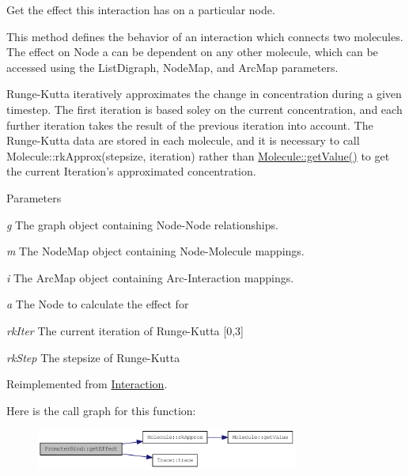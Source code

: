 Get the effect this interaction has on a particular node.

This method defines the behavior of an interaction which connects two molecules. The effect on Node a can be dependent on any other molecule, which can be accessed using the ListDigraph, NodeMap, and ArcMap parameters.

Runge-\/Kutta iteratively approximates the change in concentration during a given timestep. The first iteration is based soley on the current concentration, and each further iteration takes the result of the previous iteration into account. The Runge-\/Kutta data are stored in each molecule, and it is necessary to call Molecule::rkApprox(stepsize, iteration) rather than \hyperlink{classMolecule_a554ea822918374775d5f52b5d49d8195}{Molecule::getValue()} to get the current Iteration's approximated concentration.


\begin{DoxyParams}{Parameters}
\item[{\em g}]The graph object containing Node-\/Node relationships. \item[{\em m}]The NodeMap object containing Node-\/Molecule mappings. \item[{\em i}]The ArcMap object containing Arc-\/Interaction mappings. \item[{\em a}]The Node to calculate the effect for \item[{\em rkIter}]The current iteration of Runge-\/Kutta \mbox{[}0,3\mbox{]} \item[{\em rkStep}]The stepsize of Runge-\/Kutta \end{DoxyParams}


Reimplemented from \hyperlink{classInteraction_a6328831e714adf9c8177f6052d2e017f}{Interaction}.

Here is the call graph for this function:\nopagebreak
\begin{figure}[H]
\begin{center}
\leavevmode
\includegraphics[width=244pt]{classPromoterBind_afadb621f9976cc52d83caec0e8613244_cgraph}
\end{center}
\end{figure}


